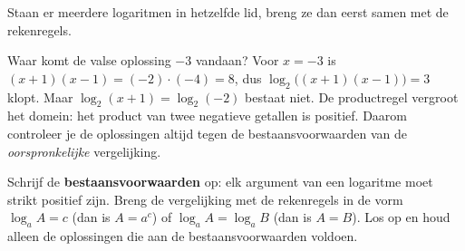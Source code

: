 
\begin{oefeningen}

\end{oefeningen}

Staan er meerdere logaritmen in hetzelfde lid, breng ze dan eerst samen met de rekenregels.


Waar komt de valse oplossing $-3$ vandaan? Voor $x = -3$ is $(x + 1)(x - 1) = (-2) \cdot (-4) = 8$, dus $\log_2\bigl((x + 1)(x - 1)\bigr) = 3$ klopt. Maar $\log_2(x + 1) = \log_2(-2)$ bestaat niet. De productregel vergroot het domein: het product van twee negatieve getallen is positief. Daarom controleer je de oplossingen altijd tegen de bestaansvoorwaarden van de \textit{oorspronkelijke} vergelijking.

\begin{werkwijze}
Schrijf de \textbf{bestaansvoorwaarden} op: elk argument van een logaritme moet strikt positief zijn. Breng de vergelijking met de rekenregels in de vorm $\log_a A = c$ (dan is $A = a^c$) of $\log_a A = \log_a B$ (dan is $A = B$). Los op en houd alleen de oplossingen die aan de bestaansvoorwaarden voldoen.
\end{werkwijze}

